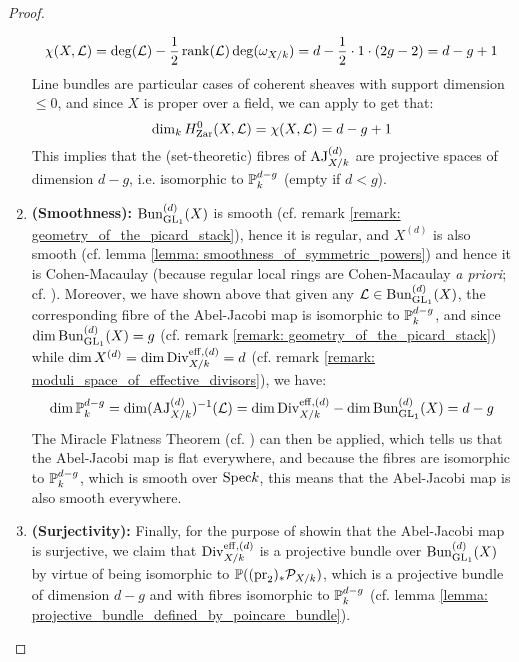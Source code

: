 \begin{proof}
\begin{enumerate}
                            $$\chi(X, \calL) = \deg(\calL) - \frac12 \rank(\calL) \deg(\omega_{X/k}) = d - \frac12 \cdot 1 \cdot (2g - 2) = d - g + 1$$
                        Line bundles are particular cases of coherent sheaves with support dimension $\leq 0$, and since $X$ is proper over a field, we can apply \cite[\href{https://stacks.math.columbia.edu/tag/0AYT}{Tag 0AYT}]{stacks} to get that:
                            $$\dim_k H^0_{\Zar}(X, \calL) = \chi(X, \calL) = d - g + 1$$
                        This implies that the (set-theoretic) fibres of $\AJ_{X/k}^{(d)}$ are projective spaces of dimension $d - g$, i.e. isomorphic to $\P^{d - g}_k$ (empty if $d < g$).
                        \item \textbf{(Smoothness):} $\Bun_{\GL_1}^{(d)}(X)$ is smooth (cf. remark \ref{remark: geometry_of_the_picard_stack}), hence it is regular, and $X^{(d)}$ is also smooth (cf. lemma \ref{lemma: smoothness_of_symmetric_powers}) and hence it is Cohen-Macaulay (because regular local rings are Cohen-Macaulay \textit{a priori}; cf. \cite[\href{https://stacks.math.columbia.edu/tag/00NQ}{Tag 00NQ}]{stacks}). Moreover, we have shown above that given any $\calL \in \Bun_{\GL_1}^{(d)}(X)$, the corresponding fibre of the Abel-Jacobi map is isomorphic to $\P^{d - g}_k$, and since $\dim \Bun_{\GL_1}^{(d)}(X) = g$ (cf. remark \ref{remark: geometry_of_the_picard_stack}) while $\dim X^{(d)} = \dim \Div_{X/k}^{\eff, (d)} = d$ (cf. remark \ref{remark: moduli_space_of_effective_divisors}), we have:
                            $$\dim \P^{d - g}_k = \dim (\AJ_{X/k}^{(d)})^{-1}(\calL) = \dim \Div_{X/k}^{\eff, (d)} - \dim \Bun_{\GL_1}^{(d)}(X) = d - g$$
                        The Miracle Flatness Theorem (cf. \cite[\href{https://stacks.math.columbia.edu/tag/00R4}{Tag 00R4}]{stacks}) can then be applied, which tells us that the Abel-Jacobi map is flat everywhere, and because the fibres are isomorphic to $\P^{d - g}_k$, which is smooth over $\Spec k$, this means that the Abel-Jacobi map is also smooth everywhere.
                        \item \textbf{(Surjectivity):} Finally, for the purpose of showin that the Abel-Jacobi map is surjective, we claim that $\Div_{X/k}^{\eff, (d)}$ is a projective bundle over $\Bun_{\GL_1}^{(d)}(X)$ by virtue of being isomorphic to $\P((\pr_2)_*\calP_{X/k})$, which is a projective bundle of dimension $d - g$ and with fibres isomorphic to $\P_k^{d - g}$ (cf. lemma \ref{lemma: projective_bundle_defined_by_poincare_bundle}). 
                    \end{enumerate}
            \end{proof}
